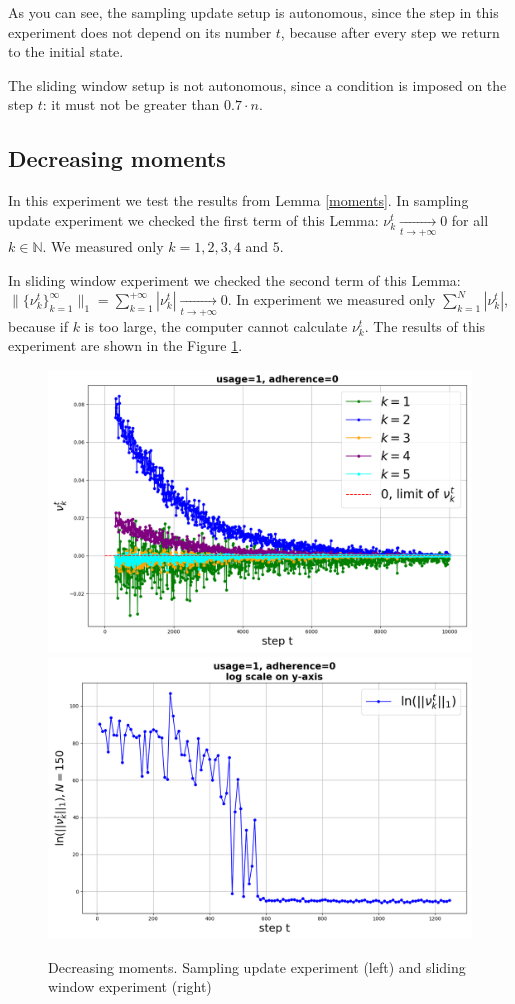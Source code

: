 \documentclass{article}
\begin{document}
        As you can see, the sampling update setup is autonomous, since the step in this experiment does not depend on its number $t$, because after every step we return to the initial state.

        The sliding window setup is not autonomous, since a condition is imposed on the step $t$: it must not be greater than $0.7 \cdot n$.

    \subsection{Decreasing moments} \label{exp_5}
        In this experiment we test the results from Lemma \ref{moments}. In sampling update experiment we checked the first term of this Lemma: $\nu_k^t \underset{t \to +\infty}{\longrightarrow} 0$ for all $k \in \mathbb{N}$. We measured only $k = 1, 2, 3, 4$ and $5$. 

        In sliding window experiment we checked the second term of this Lemma: $\|\{\nu_k^t\}_{k=1}^{\infty}\|_1 = \sum\limits_{k=1}^{+\infty} |\nu_k^t| \underset{t \to +\infty}{\longrightarrow} 0$. In experiment we measured only $\sum\limits_{k=1}^{N} |\nu_k^t|$, because if $k$ is too large, the computer cannot calculate $\nu_k^t$. The results of this experiment are shown in the Figure \ref{fig_exp_5}.
        
        \begin{figure}[h!]
            \centering
            \includegraphics[width=0.49\linewidth]{pictures/moments_sample_1_0.png}
            \includegraphics[width=0.49\linewidth]{pictures/moments_loop_1_0.png}
            
            \caption{Decreasing moments. Sampling update experiment (left) and sliding window experiment (right)}
            \label{fig_exp_5}
        \end{figure}
\end{document}
